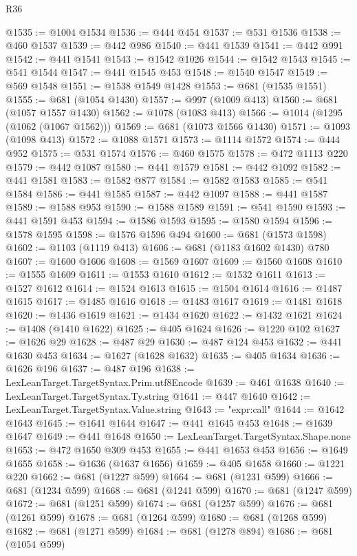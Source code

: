 \begin{lexlean}{R36}
\begin{coremodule}
{{{{{{{{{{{{{{{{{{{{{{{{{{{{{{{{{{{{{{{{{{{{{{{{{{{{{{{{{{{{{{{{{{{{{{{{{{{{{{{{{{@1535 := @1004 @1534
@1536 := @444 @454
@1537 := @531 @1536
@1538 := @460 @1537
@1539 := @442 @986
@1540 := @441 @1539
@1541 := @442 @991
@1542 := @441 @1541
@1543 := @1542 @1026
@1544 := @1542 @1543
@1545 := @541 @1544
@1547 := @441 @1545 @453
@1548 := @1540 @1547
@1549 := @569 @1548
@1551 := @1538 @1549 @1428
@1553 := @681 (@1535 @1551)
@1555 := @681 (@1054 @1430)
@1557 := @997 (@1009 @413)
@1560 := @681 (@1057 @1557 @1430)
@1562 := @1078 (@1083 @413)
@1566 := @1014 (@1295 (@1062 (@1067 @1562)))
@1569 := @681 (@1073 @1566 @1430)
@1571 := @1093 (@1098 @413)
@1572 := @1088 @1571
@1573 := @1114 @1572
@1574 := @444 @952
@1575 := @531 @1574
@1576 := @460 @1575
@1578 := @472 @1113 @220
@1579 := @442 @1087
@1580 := @441 @1579
@1581 := @442 @1092
@1582 := @441 @1581
@1583 := @1582 @877
@1584 := @1582 @1583
@1585 := @541 @1584
@1586 := @441 @1585
@1587 := @442 @1097
@1588 := @441 @1587
@1589 := @1588 @953
@1590 := @1588 @1589
@1591 := @541 @1590
@1593 := @441 @1591 @453
@1594 := @1586 @1593
@1595 := @1580 @1594
@1596 := @1578 @1595
@1598 := @1576 @1596 @494
@1600 := @681 (@1573 @1598)
@1602 := @1103 (@1119 @413)
@1606 := @681 (@1183 @1602 @1430) @780
@1607 := @1600 @1606
@1608 := @1569 @1607
@1609 := @1560 @1608
@1610 := @1555 @1609
@1611 := @1553 @1610
@1612 := @1532 @1611
@1613 := @1527 @1612
@1614 := @1524 @1613
@1615 := @1504 @1614
@1616 := @1487 @1615
@1617 := @1485 @1616
@1618 := @1483 @1617
@1619 := @1481 @1618
@1620 := @1436 @1619
@1621 := @1434 @1620
@1622 := @1432 @1621
@1624 := @1408 (@1410 @1622)
@1625 := @405 @1624
@1626 := @1220 @102
@1627 := @1626 @29
@1628 := @487 @29
@1630 := @487 @124 @453
@1632 := @441 @1630 @453
@1634 := @1627 (@1628 @1632)
@1635 := @405 @1634
@1636 := @1626 @196
@1637 := @487 @196
@1638 := LexLeanTarget.TargetSyntax.Prim.utf8Encode
@1639 := @461 @1638
@1640 := LexLeanTarget.TargetSyntax.Ty.string
@1641 := @447 @1640
@1642 := LexLeanTarget.TargetSyntax.Value.string
@1643 := "expr:call"
@1644 := @1642 @1643
@1645 := @1641 @1644
@1647 := @441 @1645 @453
@1648 := @1639 @1647
@1649 := @441 @1648
@1650 := LexLeanTarget.TargetSyntax.Shape.none
@1653 := @472 @1650 @309 @453
@1655 := @441 @1653 @453
@1656 := @1649 @1655
@1658 := @1636 (@1637 @1656)
@1659 := @405 @1658
@1660 := @1221 @220
@1662 := @681 (@1227 @599)
@1664 := @681 (@1231 @599)
@1666 := @681 (@1234 @599)
@1668 := @681 (@1241 @599)
@1670 := @681 (@1247 @599)
@1672 := @681 (@1251 @599)
@1674 := @681 (@1257 @599)
@1676 := @681 (@1261 @599)
@1678 := @681 (@1264 @599)
@1680 := @681 (@1268 @599)
@1682 := @681 (@1271 @599)
@1684 := @681 (@1278 @894)
@1686 := @681 (@1054 @599)
}}}}}}}}}}}}}}}}}}}}}}}}}}}}}}}}}}}}}}}}}}}}}}}}}}}}}}}}}}}}}}}}}}}}}}}}}}}}}}}}}}
\end{coremodule}
\end{lexlean}
